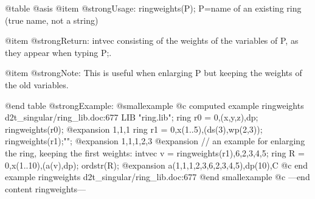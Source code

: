 @table @asis
@item @strong{Usage:}
ringweights(P); P=name of an existing ring (true name, not a string)

@item @strong{Return:}
intvec consisting of the weights of the variables of P, as they
appear when typing P;.

@item @strong{Note:}
This is useful when enlarging P but keeping the weights of the old
variables.

@end table
@strong{Example:}
@smallexample
@c computed example ringweights d2t_singular/ring_lib.doc:677 
LIB "ring.lib";
ring r0 = 0,(x,y,z),dp;
ringweights(r0);
@expansion{} 1,1,1
ring r1 = 0,x(1..5),(ds(3),wp(2,3));
ringweights(r1);"";
@expansion{} 1,1,1,2,3
@expansion{} 
// an example for enlarging the ring, keeping the first weights:
intvec v = ringweights(r1),6,2,3,4,5;
ring R = 0,x(1..10),(a(v),dp);
ordstr(R);
@expansion{} a(1,1,1,2,3,6,2,3,4,5),dp(10),C
@c end example ringweights d2t_singular/ring_lib.doc:677
@end smallexample
@c ---end content ringweights---
